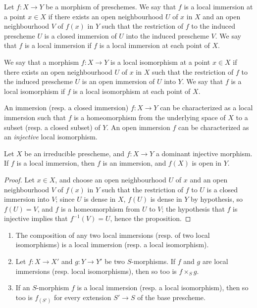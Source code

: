 \begin{definition}[4.5.1]
\label{I.4.5.1}
Let $f:X\to Y$ be a morphism of preschemes.
We say that $f$ is a local immersion at a point $x\in X$ if there exists an open neighbourhood $U$ of $x$ in $X$ and an open neighbourhood $V$ of $f(x)$ in $Y$ such that the restriction of $f$ to the induced prescheme $U$ is a closed immersion of $U$ into the induced prescheme $V$.
We say that $f$ is a local immersion if $f$ is a local immersion at each point of $X$.
\end{definition}

\begin{definition}[4.5.2]
\label{I.4.5.2}
We say that a morphism $f:X\to Y$ is a local isomorphism at
a point $x\in X$ if there exists an open neighbourhood $U$ of $x$ in $X$ such that the restriction of $f$ to the induced prescheme $U$ is an open immersion of $U$ into $Y$.
We say that $f$ is a local isomorphism if $f$ is a local isomorphism at each point of $X$.
\end{definition}

\begin{env}[4.5.3]
\label{I.4.5.3}
An immersion (resp. a closed immersion) $f:X\to Y$ can be characterized as a local immersion such that $f$ is a homeomorphism from the underlying space of $X$ to a subset (resp. a closed subset) of $Y$.
An open immersion $f$ can be characterized as an \emph{injective} local isomorphism.
\end{env}

\begin{proposition}[4.5.4]
\label{I.4.5.4}
Let $X$ be an irreducible prescheme, and $f:X\to Y$ a dominant injective morphism.
If $f$ is a local immersion, then $f$ is an immersion, and $f(X)$ is open in $Y$.
\end{proposition}

\begin{proof}
Let $x\in X$, and choose an open neighbourhood $U$ of $x$ and an open neighbourhood $V$ of $f(x)$ in $Y$ such that the restriction of $f$ to $U$ is a closed immersion into $V$;
since $U$ is dense in $X$, $f(U)$ is dense in $Y$ by hypothesis, so $f(U)=V$, and $f$ is a homeomorphism from $U$ to $V$;
the hypothesis that $f$ is injective implies that $f^{-1}(V)=U$, hence the proposition.
\end{proof}

\begin{proposition}[4.5.5]
\label{I.4.5.5}
\medskip\noindent
\begin{enumerate}
  \item[{\rm(i)}] The composition of any two local immersions (resp. of two local isomorphisms) is a local immersion (resp. a local isomorphism).
  \item[{\rm(ii)}] Let $f:X\to X'$ and $g:Y\to Y'$ be two $S$-morphisms.
    If $f$ and $g$ are local immersions (resp. local isomorphisms), then so too is $f\times_S g$.
  \item[{\rm(iii)}] If an $S$-morphism $f$ is a local immersion (resp. a local isomorphism), then so too is $f_{(S')}$ for every extension $S'\to S$ of the base prescheme.
\end{enumerate}
\end{proposition}

